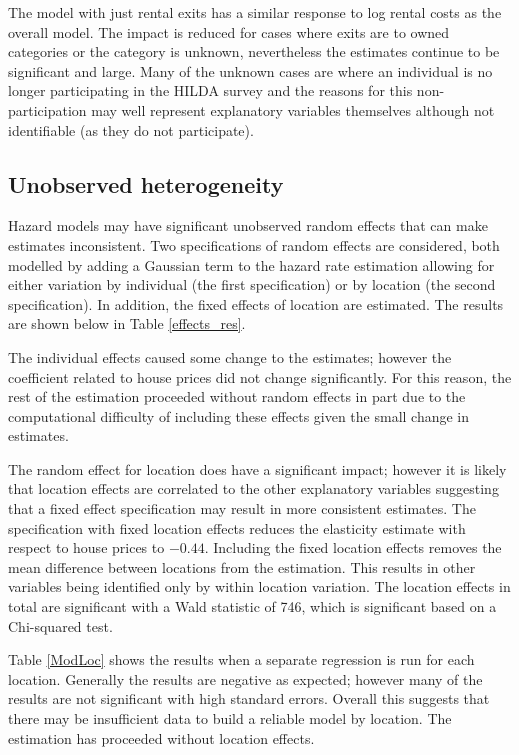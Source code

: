\documentclass[12pt]{article}
\begin{document}



The model with just rental exits has a similar response to log rental costs as the overall model. The impact is reduced for cases where exits are to owned categories or the category is unknown, nevertheless the estimates continue to be significant and large. Many of the unknown cases are where an individual is no longer participating in the HILDA survey and the reasons for this non-participation may well represent explanatory variables themselves although not identifiable (as they do not participate).

\subsection{Unobserved heterogeneity}

Hazard models may have significant unobserved random effects that can make estimates inconsistent. Two specifications of random effects are considered, both modelled by adding a Gaussian term to the hazard rate estimation allowing for either variation by individual (the first specification) or by location (the second specification). In addition, the fixed effects of location are estimated. The results are shown below in Table \ref{effects_res}.



The individual effects caused some change to the estimates; however the coefficient related to house prices did not change significantly.  For this reason, the rest of the estimation proceeded without random effects in part due to the computational difficulty of including these effects given the small change in estimates.

The random effect for location does have a significant impact; however it is likely that location effects are correlated to the other explanatory variables suggesting that a fixed effect specification may result in more consistent estimates. The specification with fixed location effects reduces the elasticity estimate with respect to house prices  to $-0.44$. Including the fixed location effects removes the mean difference between locations from the estimation. This results in other variables being identified only by within location variation. The location effects in total are significant with a Wald statistic of 746, which is significant based on a Chi-squared test.

Table \ref{ModLoc} shows the results when a separate regression is run for each location. Generally the results are negative as expected; however many of the results are not significant with high standard errors. Overall this suggests that there may be insufficient data to build a reliable model by location. The estimation has proceeded without location effects.
\end{document}

